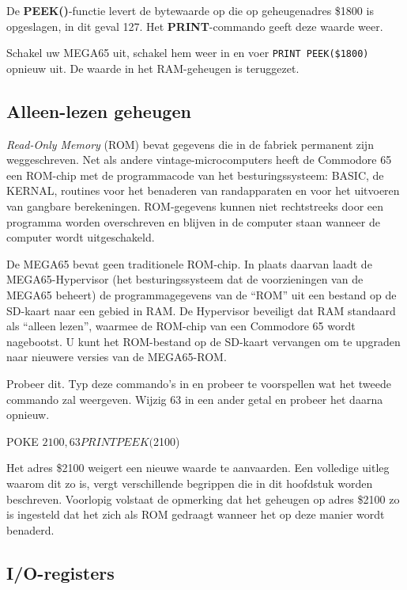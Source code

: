 De {\bf PEEK()}-functie levert de bytewaarde op die op geheugenadres \$1800 is opgeslagen, in dit geval 127. Het {\bf PRINT}-commando geeft deze waarde weer.

Schakel uw MEGA65 uit, schakel hem weer in en voer \texttt{PRINT PEEK(\$1800)} opnieuw uit. De waarde in het RAM-geheugen is teruggezet.

\subsection{Alleen-lezen geheugen}

{\em Read-Only Memory} (ROM) bevat gegevens die in de fabriek permanent zijn weggeschreven. Net als andere vintage-microcomputers heeft de Commodore 65 een ROM-chip met de programmacode van het besturingssysteem: BASIC, de KERNAL, routines voor het benaderen van randapparaten en voor het uitvoeren van gangbare berekeningen. ROM-gegevens kunnen niet rechtstreeks door een programma worden overschreven en blijven in de computer staan wanneer de computer wordt uitgeschakeld.

De MEGA65 bevat geen traditionele ROM-chip. In plaats daarvan laadt de MEGA65-Hypervisor (het besturingssysteem dat de voorzieningen van de MEGA65 beheert) de programmagegevens van de ``ROM'' uit een bestand op de SD-kaart naar een gebied in RAM. De Hypervisor beveiligt dat RAM standaard als ``alleen lezen'', waarmee de ROM-chip van een Commodore 65 wordt nagebootst. U kunt het ROM-bestand op de SD-kaart vervangen om te upgraden naar nieuwere versies van de MEGA65-ROM.

Probeer dit. Typ deze commando's in en probeer te voorspellen wat het tweede commando zal weergeven. Wijzig 63 in een ander getal en probeer het daarna opnieuw.

\begin{basiccode}
POKE $2100,63
PRINT PEEK($2100)
\end{basiccode}

Het adres \$2100 weigert een nieuwe waarde te aanvaarden. Een volledige uitleg waarom dit zo is, vergt verschillende begrippen die in dit hoofdstuk worden beschreven. Voorlopig volstaat de opmerking dat het geheugen op adres \$2100 zo is ingesteld dat het zich als ROM gedraagt wanneer het op deze manier wordt benaderd.

\subsection{I/O-registers}

